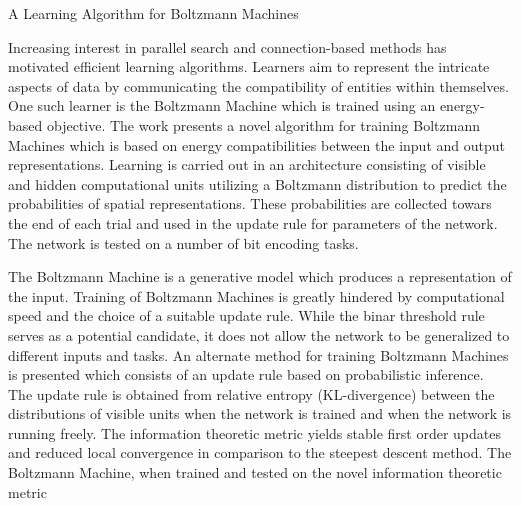 \documentclass[11pt,letterpaper]{article}
\begin{document}
\begin{center}
  \large{A Learning Algorithm for Boltzmann Machines}
\end{center}


Increasing interest in parallel search and connection-based methods has motivated efficient learning algorithms. Learners aim to represent the intricate aspects of data by communicating the compatibility of entities within themselves. One such learner is the Boltzmann Machine which is trained using an energy-based objective. The work presents a novel algorithm for training Boltzmann Machines which is based on energy compatibilities between the input and output representations. Learning is carried out in an architecture consisting of visible and hidden computational units utilizing a Boltzmann distribution to predict the probabilities of spatial representations. These probabilities are collected towars the end of each trial and used in the update rule for parameters of the network. The network is tested on a number of bit encoding tasks. 

The Boltzmann Machine is a generative model which produces a representation of the input. Training of Boltzmann Machines is greatly hindered by computational speed and the choice of a suitable update rule. While the binar threshold rule serves as a potential candidate, it does not allow the network to be generalized to different inputs and tasks. An alternate method for training Boltzmann Machines is presented which consists of an update rule based on probabilistic inference. The update rule is obtained from relative entropy (KL-divergence) between the distributions of visible units when the network is trained and when the network is running freely. The information theoretic metric yields stable first order updates and reduced local convergence in comparison to the steepest descent method. The Boltzmann Machine, when trained and tested on the novel information theoretic metric  
\end{document}
